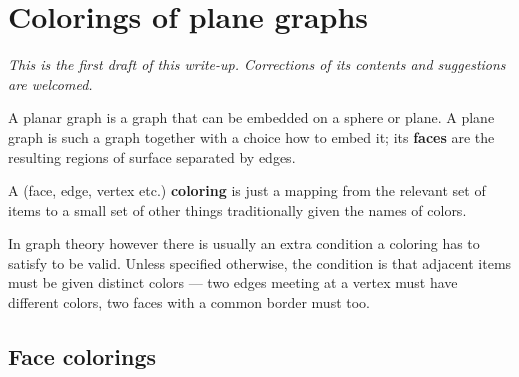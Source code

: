 \documentclass[12pt]{article}
\begin{document}

\section*{Colorings of plane graphs} %

{\small\em This is the first draft of this write-up. Corrections of its contents and suggestions are welcomed.}

A planar graph
is a graph that can be embedded on a sphere or plane.
A plane graph
is such a graph together with a choice how to embed it; its {\bf faces}
are the resulting regions of surface separated by edges.

A (face, edge, vertex etc.) {\bf coloring} is just a mapping from the relevant
set of items to a small set of other things traditionally given the names of
colors.

In graph theory however there is usually an extra condition a coloring has to
satisfy to be valid. Unless specified otherwise, the condition is that
adjacent items must be given distinct colors --- two edges meeting at a vertex
must have different colors, two faces with a common border must too.

\vfill\pagebreak
\subsection*{Face colorings}
\end{document}
